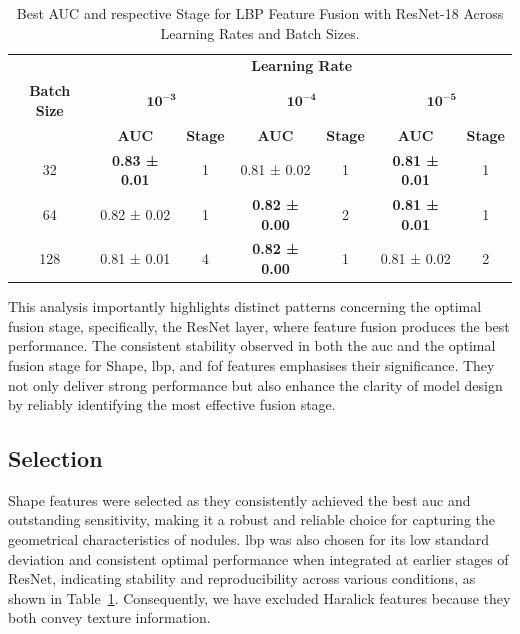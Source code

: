 \begin{table}[htbp]
  \centering
  \caption[Best AUC and Stage for LBP Fusion]{Best AUC and respective Stage for LBP Feature Fusion with ResNet-18 Across Learning Rates and Batch Sizes.}
  \label{tab:lbp_hyperparam}
  \begin{tabular}{@{} c *{3}{cc} @{}}
    \toprule
    & \multicolumn{6}{c}{\textbf{Learning Rate}} \\
    \cmidrule(lr){2-7}
    \textbf{Batch Size}
      & \multicolumn{2}{c}{\(\mathbf{10^{-3}}\)}
      & \multicolumn{2}{c}{\(\mathbf{10^{-4}}\)}
      & \multicolumn{2}{c}{\(\mathbf{10^{-5}}\)} \\
    \cmidrule(lr){2-3} \cmidrule(lr){4-5} \cmidrule(lr){6-7}
    & \textbf{AUC} & \textbf{Stage}
      & \textbf{AUC} & \textbf{Stage}
      & \textbf{AUC} & \textbf{Stage} \\
    \midrule
    32  
      & \textbf{0.83 ± 0.01} & 1 
      & 0.81 ± 0.02 & 1 
      & \textbf{0.81 ± 0.01} & 1 \\
    64  
      & 0.82 ± 0.02 & 1 
      & \textbf{0.82 ± 0.00} & 2 
      & \textbf{0.81 ± 0.01} & 1 \\
    128 
      & 0.81 ± 0.01 & 4 
      & \textbf{0.82 ± 0.00} & 1 
      & 0.81 ± 0.02 & 2 \\
    \bottomrule
  \end{tabular}
\end{table}

This analysis importantly highlights distinct patterns concerning the optimal fusion stage, specifically, the ResNet layer, where feature fusion produces the best performance. The consistent stability observed in both the \ac{auc} and the optimal fusion stage for Shape, \ac{lbp}, and \ac{fof} features emphasises their significance. They not only deliver strong performance but also enhance the clarity of model design by reliably identifying the most effective fusion stage.

\FloatBarrier

\subsection{Selection}
Shape features were selected as they consistently achieved the best \ac{auc} and outstanding sensitivity, making it a robust and reliable choice for capturing the geometrical characteristics of nodules.
\ac{lbp} was also chosen for its low standard deviation and consistent optimal performance when integrated at earlier stages of ResNet, indicating stability and reproducibility across various conditions, as shown in Table~\ref{tab:lbp_hyperparam}. Consequently, we have excluded Haralick features because they both convey texture information.

